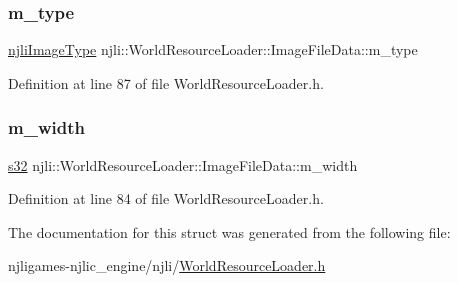 \subsubsection{\texorpdfstring{m\+\_\+type}{m\_type}}
{\footnotesize\ttfamily \mbox{\hyperlink{namespacenjli_a709a24b63b768ce1cdff54f7f48d3c0b}{njli\+Image\+Type}} njli\+::\+World\+Resource\+Loader\+::\+Image\+File\+Data\+::m\+\_\+type\hspace{0.3cm}{\ttfamily [private]}}



Definition at line 87 of file World\+Resource\+Loader.\+h.

\mbox{\label{structnjli_1_1_world_resource_loader_1_1_image_file_data_a815ccf3f42b60a7beead9461aab34639}} 
\subsubsection{\texorpdfstring{m\+\_\+width}{m\_width}}
{\footnotesize\ttfamily \mbox{\hyperlink{_util_8h_aa62c75d314a0d1f37f79c4b73b2292e2}{s32}} njli\+::\+World\+Resource\+Loader\+::\+Image\+File\+Data\+::m\+\_\+width\hspace{0.3cm}{\ttfamily [private]}}



Definition at line 84 of file World\+Resource\+Loader.\+h.



The documentation for this struct was generated from the following file\+:\begin{DoxyCompactItemize}
\item 
njligames-\/njlic\+\_\+engine/njli/\mbox{\hyperlink{_world_resource_loader_8h}{World\+Resource\+Loader.\+h}}\end{DoxyCompactItemize}
